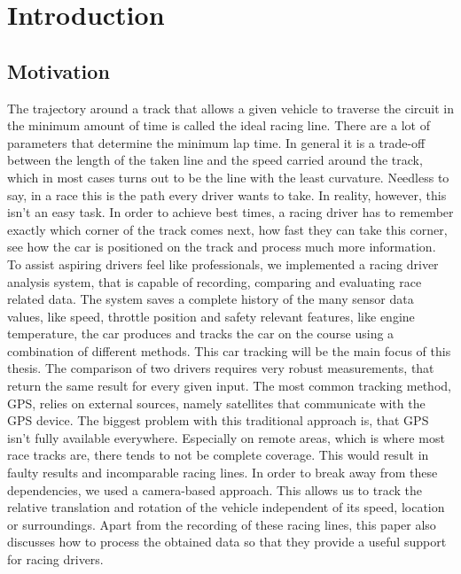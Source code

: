 \section{Introduction}
\label{sec:intro}

\subsection{Motivation}
The trajectory around a track that allows a given vehicle to traverse the circuit in the minimum amount of time is called the ideal racing line. There are a lot of parameters that determine the minimum lap time. In general it is a trade-off between the length of the taken line and the speed carried around the track, which in most cases turns out to be the line with the least curvature.  
Needless to say, in a race this is the path every driver wants to take. In reality, however, this isn't an easy task. In order to achieve best times, a racing driver has to remember exactly which corner of the track comes next, how fast they can take this corner, see how the car is positioned on the track and process much more information.
To assist aspiring drivers feel like professionals, we implemented a racing driver analysis system, that is capable of recording, comparing and evaluating race related data. The system saves a complete history of the many sensor data values, like speed, throttle position and safety relevant features, like engine temperature, the car produces and tracks the car on the course using a combination of different methods.
This car tracking will be the main focus of this thesis. The comparison of two drivers requires very robust measurements, that return the same result for every given input.
The most common tracking method, GPS, relies on external sources, namely satellites that communicate with the GPS device. The biggest problem with this traditional approach is, that GPS isn't fully available everywhere. Especially on remote areas, which is where most race tracks are, there tends to not be complete coverage. This would result in faulty results and incomparable racing lines.
In order to break away from these dependencies, we used a camera-based approach. This allows us to track the relative translation and rotation of the vehicle independent of its speed, location or surroundings.
Apart from the recording of these racing lines, this paper also discusses how to process the obtained data so that they provide a useful support for racing drivers.


